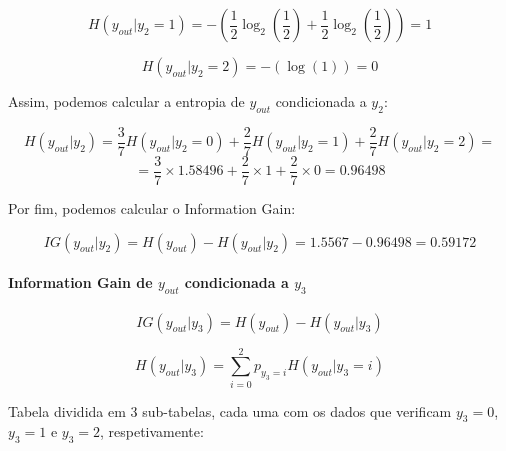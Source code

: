 \documentclass{article}
\begin{document}
\[ H(y_{out}|y_2 = 1) = - \left( \frac{1}{2} \log_2 \left( \frac{1}{2} \right) + \frac{1}{2} \log_2 \left( \frac{1}{2} \right) \right) = 1 \]

\[ H(y_{out}|y_2 = 2) = - \left( \log(1) \right) = 0 \]

Assim, podemos calcular a entropia de $y_{out}$ condicionada a $y_2$:

\[ H(y_{out}|y_2) = \frac{3}{7} H(y_{out}|y_2 = 0) + \frac{2}{7} H(y_{out}|y_2 = 1) + \frac{2}{7} H(y_{out}|y_2 = 2) = \]
\[ = \frac{3}{7} \times 1.58496 + \frac{2}{7} \times 1 + \frac{2}{7} \times 0 = 0.96498 \]

Por fim, podemos calcular o Information Gain:

\[ IG(y_{out}|y_2) = H(y_{out}) - H(y_{out}|y_2) = 1.5567 - 0.96498 = 0.59172 \]

\paragraph{Information Gain de $y_{out}$ condicionada a $y_3$}

\[ IG(y_{out}|y_3) = H(y_{out}) - H(y_{out}|y_3) \]

\[ H(y_{out}|y_3) = \sum_{i=0}^{2} p_{y_3 = i} H(y_{out}|y_3 = i) \]

Tabela dividida em 3 sub-tabelas, cada uma com os dados que verificam $y_3 = 0$, $y_3 = 1$ e $y_3 = 2$, respetivamente:
\end{document}
